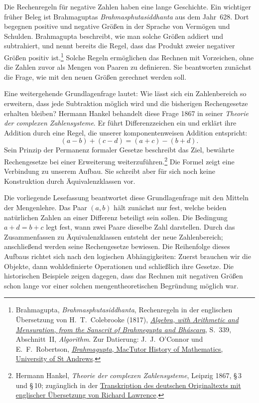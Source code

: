 Die Rechenregeln für negative Zahlen haben eine lange Geschichte.
Ein wichtiger früher Beleg ist Brahmaguptas
\emph{Brahmasphutasiddhanta} aus dem Jahr~628. Dort begegnen
positive und negative Größen in der Sprache von Vermögen und
Schulden. Brahmagupta beschreibt, wie man solche Größen addiert
und subtrahiert, und nennt bereits die Regel, dass das Produkt
zweier negativer Größen positiv ist.\footnote{Brahmagupta,
\emph{Brahmasphutasiddhanta}, Rechenregeln in der englischen
Übersetzung von H.~T.~Colebrooke (1817),
\href{https://www.hist-math.fr/textes/Colebrooke1817_BrahmeguptaBhaskaracharya.pdf}{\emph{Algebra, with Arithmetic and Mensuration, from the Sanscrit of Brahmegupta and Bháscara}},
S.~339, Abschnitt~II, \emph{Algorithm}.
Zur Datierung: J.~J.~O'Connor und E.~F.~Robertson,
\href{https://mathshistory.st-andrews.ac.uk/Biographies/Brahmagupta/}{\emph{Brahmagupta}, MacTutor History of Mathematics, University of St Andrews}.}
Solche Regeln ermöglichen das Rechnen mit Vorzeichen, ohne
die Zahlen zuvor als Mengen von Paaren zu definieren. Sie
beantworten zunächst die Frage, wie mit den neuen Größen
gerechnet werden soll.

Eine weitergehende Grundlagenfrage lautet: Wie lässt sich ein
Zahlenbereich so erweitern, dass jede Subtraktion möglich wird
und die bisherigen Rechengesetze erhalten bleiben? Hermann
Hankel behandelt diese Frage 1867 in seiner
\emph{Theorie der complexen Zahlensysteme}. Er führt
Differenzzeichen ein und erklärt ihre Addition durch eine
Regel, die unserer komponentenweisen Addition entspricht:
\[
  (a-b)+(c-d)=(a+c)-(b+d).
\]
Sein Prinzip der Permanenz formaler Gesetze beschreibt das
Ziel, bewährte Rechengesetze bei einer Erweiterung
weiterzuführen.\footnote{Hermann Hankel,
\emph{Theorie der complexen Zahlensysteme}, Leipzig 1867,
\S\,3 und \S\,10; zugänglich in der
\href{https://wyleyr.github.io/hankel1867tr/}{Transkription des deutschen Originaltexts mit englischer Übersetzung von Richard Lawrence}.}
Die Formel zeigt eine Verbindung zu unserem Aufbau. Sie
schreibt aber für sich noch keine Konstruktion durch
Äquivalenzklassen vor.

Die vorliegende Lesefassung beantwortet diese Grundlagenfrage
mit den Mitteln der Mengenlehre. Das Paar \((a,b)\) hält
zunächst nur fest, welche beiden natürlichen Zahlen an einer
Differenz beteiligt sein sollen. Die Bedingung \(a+d=b+c\)
legt fest, wann zwei Paare dieselbe Zahl darstellen. Durch
das Zusammenfassen zu Äquivalenzklassen entsteht der neue
Zahlenbereich; anschließend werden seine Rechengesetze
bewiesen. Die Reihenfolge dieses Aufbaus richtet sich nach
den logischen Abhängigkeiten: Zuerst brauchen wir die
Objekte, dann wohldefinierte Operationen und schließlich
ihre Gesetze. Die historischen Beispiele zeigen dagegen,
dass das Rechnen mit negativen Größen schon lange vor
einer solchen mengentheoretischen Begründung möglich war.
